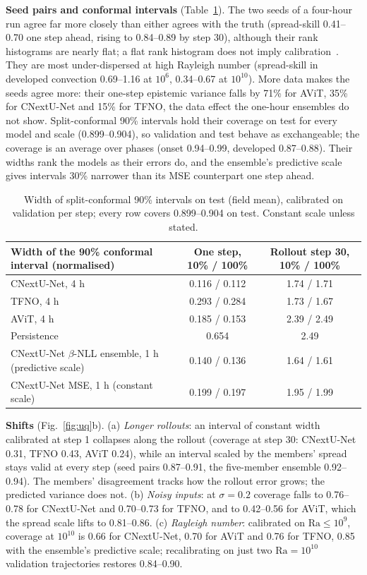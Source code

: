 \documentclass[11pt]{article}
\begin{document}
\textbf{Seed pairs and conformal intervals} (Table~\ref{tab:conformal}). The two seeds of a four-hour run agree far
more closely than either agrees with the truth (spread-skill 0.41--0.70 one step ahead, rising to 0.84--0.89 by step
30), although their rank histograms are nearly flat; a flat rank histogram does not imply
calibration~\cite{hamill2001rank}. They are most under-dispersed at high Rayleigh number (spread-skill in developed
convection 0.69--1.16 at $10^6$, 0.34--0.67 at $10^{10}$). More data makes the seeds agree more: their one-step epistemic variance falls by
71\% for AViT, 35\% for CNextU-Net and 15\% for TFNO, the data effect the one-hour ensembles do not show. Split-conformal
90\% intervals hold their coverage on test for every model and scale (0.899--0.904), so validation and test behave as
exchangeable; the coverage is an average over phases (onset 0.94--0.99, developed 0.87--0.88). Their widths rank the
models as their errors do, and the ensemble's predictive scale gives intervals 30\% narrower than its MSE counterpart
one step ahead.

\begin{table}[!htbp]
\centering\small
\begin{tabular}{@{}lcc@{}}
\toprule
Width of the 90\% conformal interval (normalised) & One step, 10\% / 100\% & Rollout step 30, 10\% / 100\% \\
\midrule
CNextU-Net, 4 h & 0.116 / 0.112 & 1.74 / 1.71 \\
TFNO, 4 h & 0.293 / 0.284 & 1.73 / 1.67 \\
AViT, 4 h & 0.185 / 0.153 & 2.39 / 2.49 \\
Persistence & 0.654 & 2.49 \\
\midrule
CNextU-Net $\beta$-NLL ensemble, 1 h (predictive scale) & 0.140 / 0.136 & 1.64 / 1.61 \\
CNextU-Net MSE, 1 h (constant scale) & 0.199 / 0.197 & 1.95 / 1.99 \\
\bottomrule
\end{tabular}
\caption{Width of split-conformal 90\% intervals on test (field mean), calibrated on validation per step; every row
covers 0.899--0.904 on test. Constant scale unless stated.}
\label{tab:conformal}
\end{table}

\textbf{Shifts} (Fig.~\ref{fig:uq}b). (a) \emph{Longer rollouts}: an interval of constant width calibrated at step 1
collapses along the rollout (coverage at step 30: CNextU-Net 0.31, TFNO 0.43, AViT 0.24), while an interval scaled by
the members' spread stays valid at every step (seed pairs 0.87--0.91, the five-member ensemble 0.92--0.94). The
members' disagreement tracks how the rollout error grows; the predicted variance does not. (b) \emph{Noisy inputs}:
at $\sigma=0.2$ coverage falls to 0.76--0.78 for CNextU-Net and 0.70--0.73 for TFNO, and to 0.42--0.56 for AViT, which
the spread scale lifts to 0.81--0.86. (c) \emph{Rayleigh number}: calibrated on $\mathrm{Ra}\le10^9$, coverage at
$10^{10}$ is 0.66 for CNextU-Net, 0.70 for AViT and 0.76 for TFNO, 0.85 with the ensemble's predictive scale;
recalibrating on just two $\mathrm{Ra}=10^{10}$ validation trajectories restores 0.84--0.90.
\end{document}
